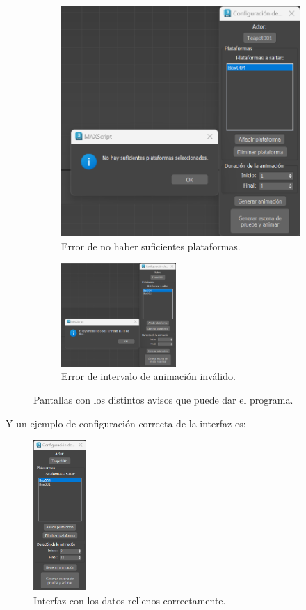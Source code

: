 \begin{figure}[H]
\begin{subfigure}[t]{0.48\textwidth}
    \includegraphics[width=\textwidth]{imagenes/error2.png}
    \caption{Error de no haber suficientes plataformas.}
 \end{subfigure}
\par\bigskip
\begin{subfigure}[t]{\textwidth}
    \centering
    \includegraphics[width=0.48\textwidth]{imagenes/error3.png}
    \caption{Error de intervalo de animación inválido.}
 \end{subfigure}
 \caption{Pantallas con los distintos avisos que puede dar el programa.}
\end{figure}

\newpage

Y un ejemplo de configuración correcta de la interfaz es:


\begin{figure}[H]
    \centering
    \includegraphics[width=0.18\textwidth]{imagenes/ui2.png}
    \caption{Interfaz con los datos rellenos correctamente.}
 \end{figure}